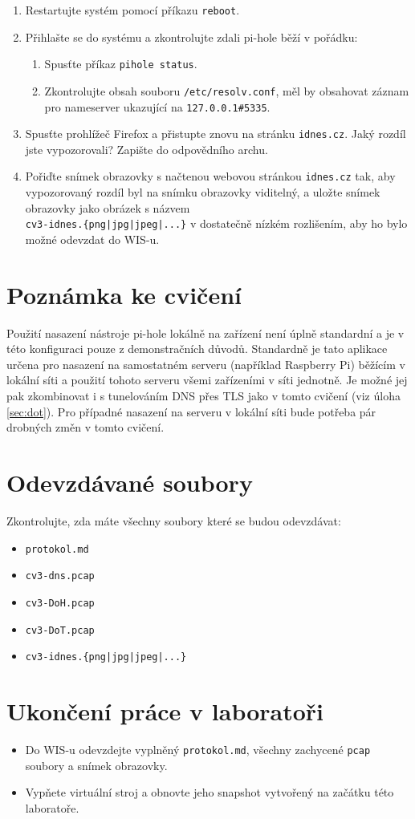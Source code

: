 \begin{enumerate}
    \item Restartujte systém pomocí příkazu \texttt{reboot}.
    \item Přihlašte se do systému a zkontrolujte zdali pi-hole běží v pořádku:
    \begin{enumerate}
        \item Spusťte příkaz \texttt{pihole status}.
        \item Zkontrolujte obsah souboru \texttt{/etc/resolv.conf}, měl by obsahovat záznam pro nameserver ukazující na \texttt{127.0.0.1\#5335}.
    \end{enumerate}
    \item Spusťte prohlížeč Firefox a přistupte znovu na stránku \texttt{idnes.cz}. Jaký rozdíl jste vypozorovali? Zapište do odpovědního archu.
	\item Pořiďte snímek obrazovky s načtenou webovou stránkou \texttt{idnes.cz} tak, aby vypozorovaný rozdíl byl na snímku obrazovky viditelný, a uložte snímek obrazovky jako obrázek s názvem\\ \texttt{cv3-idnes.\{png|jpg|jpeg|...\}} v dostatečně nízkém rozlišením, aby ho bylo možné odevzdat do WIS-u.
\end{enumerate}

\section*{Poznámka ke cvičení}
Použití nasazení nástroje pi-hole lokálně na zařízení není úplně standardní a je v této konfiguraci pouze z demonstračních důvodů. Standardně je tato aplikace určena pro nasazení na samostatném serveru (například Raspberry Pi) běžícím v lokální síti a použití tohoto serveru všemi zařízeními v síti jednotně. Je možné jej pak zkombinovat i s tunelováním DNS přes TLS jako v tomto cvičení (viz úloha \ref{sec:dot}). Pro případné nasazení na serveru v lokální síti bude potřeba pár drobných změn v tomto cvičení.

\section*{Odevzdávané soubory}
Zkontrolujte, zda máte všechny soubory které se budou odevzdávat:
\begin{itemize}
  \item \texttt{protokol.md}
  \item \texttt{cv3-dns.pcap}
  \item \texttt{cv3-DoH.pcap}
  \item \texttt{cv3-DoT.pcap}
  \item \texttt{cv3-idnes.\{png|jpg|jpeg|...\}}
\end{itemize}

\section*{Ukončení práce v laboratoři}
\begin{itemize}
	\item Do WIS-u odevzdejte vyplněný \texttt{protokol.md}, všechny zachycené \texttt{pcap} soubory a snímek obrazovky.
	\item Vypňete virtuální stroj a obnovte jeho snapshot vytvořený na začátku této laboratoře.
\end{itemize}
